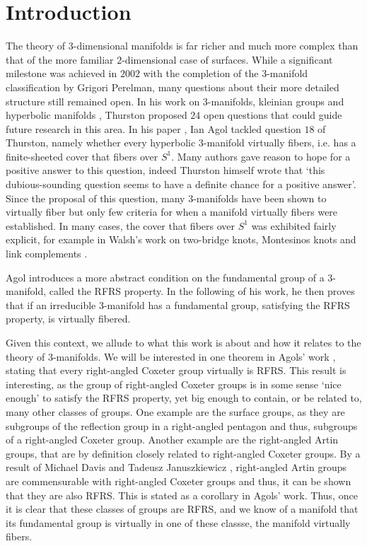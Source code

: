 \chapter{Introduction}\label{ch:introduction}

The theory of \(3\)-dimensional manifolds is far richer and much more complex than that of the more familiar \(2\)-dimensional case of surfaces.
While a significant milestone was achieved in \(2002\) with the completion of the \(3\)-manifold classification by Grigori Perelman, many questions about their more detailed structure still remained open.
In his work on \(3\)-manifolds, kleinian groups and hyperbolic manifolds \cite{Thurston1982}, Thurston proposed \(24\) open questions that could guide future research in this area.
In his paper \cite{Agol2008}, Ian Agol tackled question \(18\) of Thurston, namely whether every hyperbolic \(3\)-manifold virtually fibers, i.e. has a finite-sheeted cover that fibers over \(S^1\).
Many authors gave reason to hope for a positive answer to this question, indeed Thurston himself wrote that `this dubious-sounding question seems to have a definite chance for a positive answer'.
Since the proposal of this question, many \(3\)-manifolds have been shown to virtually fiber but only few criteria for when a manifold virtually fibers were established.
In many cases, the cover that fibers over \(S^1\) was exhibited fairly explicit, for example in Walsh's work on two-bridge knots, Montesinos knots and link complements \cite{Walsh2004}.

Agol introduces a more abstract condition on the fundamental group of a \(3\)-manifold, called the RFRS property.
In the following of his work, he then proves that if an irreducible \(3\)-manifold has a fundamental group, satisfying the RFRS property, is virtually fibered.

Given this context, we allude to what this work is about and how it relates to the theory of \(3\)-manifolds.
We will be interested in one theorem in Agols' work \cite[Criteria for virtual fibering]{Agol2008}, stating that every right-angled Coxeter group virtually is RFRS.
This result is interesting, as the group of right-angled Coxeter groups is in some sense `nice enough' to satisfy the RFRS property, yet big enough to contain, or be related to, many other classes of groups.
One example are the surface groups, as they are subgroups of the reflection group in a right-angled pentagon and thus, subgroups of a right-angled Coxeter group.
Another example are the right-angled Artin groups, that are by definition closely related to right-angled Coxeter groups.
By a result of Michael Davis and Tadeusz Januszkiewicz \cite{Davis2000}, right-angled Artin groups are commensurable with right-angled Coxeter groups and thus, it can be shown that they are also RFRS.
This is stated as a corollary in Agols' work.
Thus, once it is clear that these classes of groups are RFRS, and we know of a manifold that its fundamental group is virtually in one of these classse, the manifold virtually fibers.

